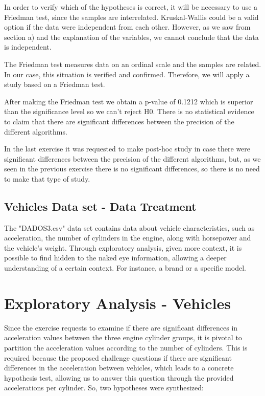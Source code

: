 \documentclass[conference]{IEEEtran}
\begin{document}
In order to verify which of the hypotheses is correct, it will be necessary to use a Friedman test, since the samples are interrelated. Kruskal-Wallis could be a valid option if the data were independent from each other. However, as we saw from section a) and the explanation of the variables, we cannot conclude that the data is independent.

The Friedman test measures data on an ordinal scale and the samples are related. In our case, this situation is verified and confirmed. Therefore, we will apply a study based on a Friedman test.

After making the Friedman test we obtain a p-value of 0.1212 which is superior than the significance level so we can't reject H0. There is no statistical evidence to claim that there are significant differences between the precision of the different algorithms.

In the last exercise it was requested to make post-hoc study in case there were significant differences between the precision of the different algorithms, but, as we seen in the previous exercise there is no significant differences, so there is no need to make that type of study.

\subsection{Vehicles Data set - Data Treatment}
The "DADOS3.csv" data set contains data about vehicle characteristics, such as acceleration, the number of cylinders in the engine, along with horsepower and the vehicle's weight.
Through exploratory analysis, given more context, it is possible to find hidden to the naked eye information, allowing a deeper understanding of a certain context.
For instance, a brand or a specific model.
\section{Exploratory Analysis - Vehicles}
Since the exercise requests to examine if there are significant differences in acceleration values between the three engine cylinder groups, 
it is pivotal to partition the acceleration values according to the number of cylinders. 
This is required because the proposed challenge questions if there are significant differences in the acceleration between vehicles, 
which leads to a concrete hypothesis test, allowing us to answer this question through the provided accelerations per cylinder.
So, two hypotheses were synthesized:
\end{document}
